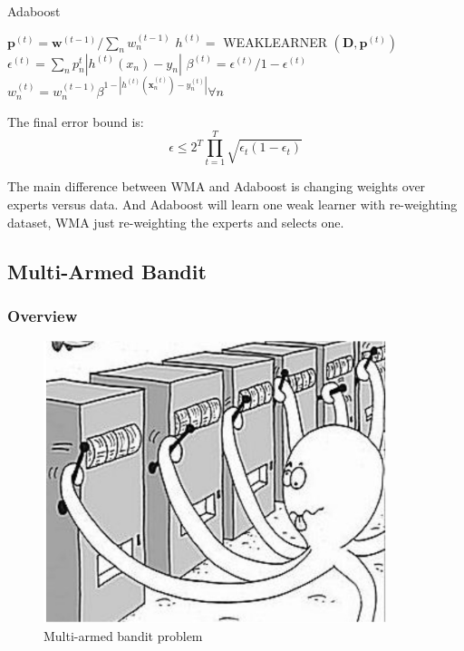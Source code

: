 \documentclass[11pt]{article}
\begin{document}
\begin{algorithm}
\caption{Adaboost}
\begin{algorithmic}[1]

        \State $\boldsymbol{p}^{(t)}=\boldsymbol{w}^{(t-1)} / \sum_{n} w_{n}^{(t-1)}$
        \State $h^{(t)}=$ WEAKLEARNER $\left(\boldsymbol{D}, \boldsymbol{p}^{(t)}\right)$ 
        \State $\epsilon^{(t)}=\sum_{n} p_{n}^{t}\left|h^{(t)}\left(x_{n}\right)-y_{n}\right|$
        \State $\beta^{(t)}=\epsilon^{(t)} / 1-\epsilon^{(t)}$
        \State $w_{n}^{(t)}=w_{n}^{(t-1)} \beta^{1-\left|h^{(t)}\left(\boldsymbol{x}_{n}^{(t)}\right)-y_{n}^{(t)}\right|} \forall n$ 
    \EndFor

\end{algorithmic}
\end{algorithm}

The final error bound is: 
\begin{equation}
    \epsilon \leq 2^{T} \prod_{t=1}^{T} \sqrt{\epsilon_{t}\left(1-\epsilon_{t}\right)}
\end{equation}

The main difference between WMA and Adaboost is changing weights over experts versus data. And Adaboost will learn one weak learner with re-weighting dataset, WMA just re-weighting the experts and selects one.

\subsection{Multi-Armed Bandit}

\subsubsection{Overview}

\begin{figure}[htbp]
    \centering
\includegraphics[width=10cm]{83BC5798-A361-4DFB-AB9E-C6E591FFE33A.png}
    \caption{Multi-armed bandit problem}
    \label{fig:bandit}
\end{figure} 
\end{document}
